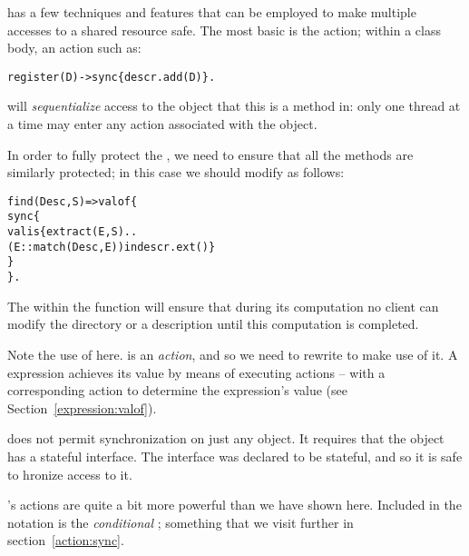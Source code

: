 \go has a few techniques and features that can be employed to make multiple accesses to a shared resource safe. The most basic is the  action; within a class body, an action such as:
\begin{alltt}
register(D) -> sync\{ descr.add(D) \}.
\end{alltt}
will \emph{sequentialize} access to the object that this is a method in: only one thread at a time may enter any  action associated with the object. 

In order to fully protect the , we need to ensure that all the methods are similarly protected; in this case we should modify  as follows:
\begin{alltt}
find(Desc,S) => valof\{
    sync\{
      valis\{ extract(E,S) .. 
               (E::match(Desc,E)) in descr.ext()\}
    \}
  \}.
\end{alltt}
The  within the  function will ensure that during its computation no client can modify the directory or  a description until this computation is completed.

Note the use of  here.  is an \emph{action}, and so we need to rewrite  to make use of it. A  expression achieves its value by means of executing actions -- with a corresponding  action to determine the  expression's value (see Section~\vref{expression:valof}).

\go does not permit synchronization on just any object. It requires that the object has a stateful interface. The  interface was declared to be stateful, and so it is safe to hronize access to it.

\go's  actions are quite a bit more powerful than we have shown here. Included in the notation is the \emph{conditional} ; something that we visit further in section~\vref{action:sync}.

